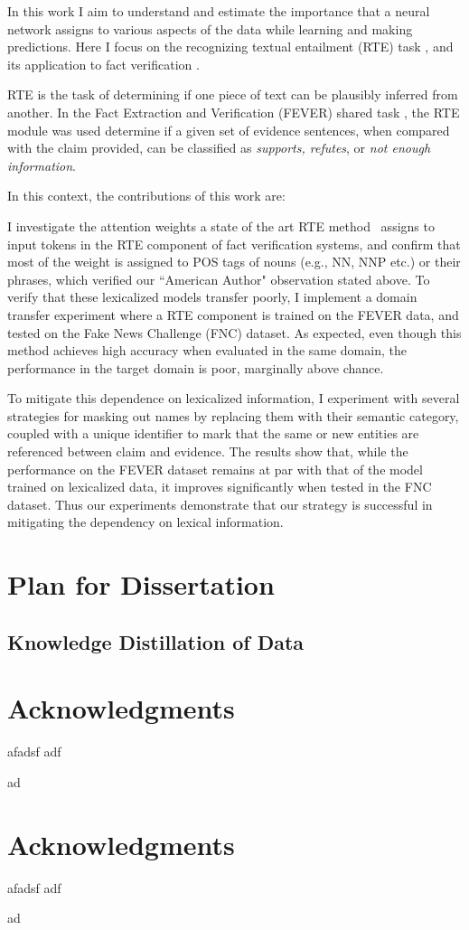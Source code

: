 \documentclass[conference,onecolumn]{IEEEtran}
\begin{document}
In this work I aim to understand and estimate the importance that a neural network assigns to various aspects of the data while learning and making predictions. Here I focus on the recognizing textual entailment (RTE) task \cite{dagan2013recognizing}, and its application to fact verification \cite{thorne2018fever}.

RTE is the task of determining if one piece of text can be plausibly inferred from another. In the Fact Extraction and Verification (FEVER) shared task \cite{thorne2018fever}, the RTE module was used determine if a given set of evidence sentences, when compared with the claim provided, can be classified as \textit{supports, refutes}, or \textit{not enough information}.


In this context, the contributions of this work are:

{\flushleft {}}

{} I investigate the attention weights a state of the art RTE method~\cite{parikh2016decomposable} assigns to input tokens in the RTE component of fact verification systems, and confirm that most of the weight is assigned to POS tags of nouns (e.g., NN, NNP etc.) or their phrases, which verified our ``American Author" observation stated above.
{}  To verify that these lexicalized models transfer poorly, I implement a domain transfer experiment where a RTE component is trained on the FEVER data, and tested on the Fake News Challenge (FNC) \cite{pomerleau2017fake} dataset. As expected, even though this method achieves high accuracy when evaluated in the same domain, the performance in the target domain is poor, marginally above chance.

{}  To mitigate this dependence on lexicalized information, I experiment with several strategies for masking out names by replacing them with their semantic category, coupled with a unique identifier to mark that the same or new entities are referenced between claim and evidence. The results show that, while the performance on the FEVER dataset remains at par with that of the model trained on lexicalized data, it improves significantly when tested in the FNC dataset. Thus our experiments demonstrate that our strategy is successful in mitigating the dependency on lexical information.



\section*{Plan for Dissertation}
\subsection{Knowledge Distillation of Data}

\section*{Acknowledgments}
afadsf
adf

ad
\section*{Acknowledgments}
afadsf
adf

ad




\balance
\begin{spacing}{0.88}


\end{spacing}

\end{document}
